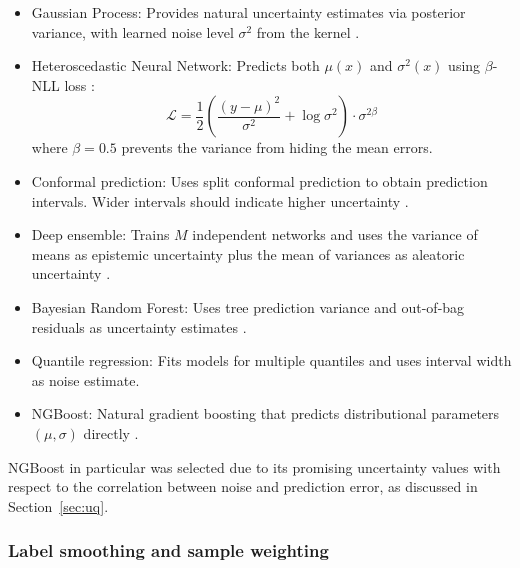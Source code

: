 \begin{itemize}
    \item Gaussian Process: Provides natural uncertainty estimates via posterior variance, with learned noise level $\sigma^2$ from the kernel \citep{gauche}.
    
    \item Heteroscedastic Neural Network: Predicts both $\mu(x)$ and $\sigma^2(x)$ using $\beta$-NLL loss \citep{Seitzer2022}:
    $$\mathcal{L} = \frac{1}{2}\left(\frac{(y - \mu)^2}{\sigma^2} + \log \sigma^2\right) \cdot \sigma^{2\beta}$$
    where $\beta = 0.5$ prevents the variance from hiding the mean errors.
    
    \item Conformal prediction: Uses split conformal prediction to obtain prediction intervals. Wider intervals should indicate higher uncertainty \citep{Shafer2008}.
    
    \item Deep ensemble: Trains $M$ independent networks and uses the variance of means as epistemic uncertainty plus the mean of variances as aleatoric uncertainty \citep{lakshminarayanan2017}.
    
    \item Bayesian Random Forest: Uses tree prediction variance and out-of-bag residuals as uncertainty estimates \citep{taddy2015}.
    
    \item Quantile regression: Fits models for multiple quantiles and uses interval width as noise estimate.
    
    \item NGBoost: Natural gradient boosting that predicts distributional parameters $(\mu, \sigma)$ directly \citep{Duan2020}.
\end{itemize}

NGBoost in particular was selected due to its promising uncertainty values with respect to the correlation between noise and prediction error, as discussed in Section~\ref{sec:uq}.  

\subsubsection{Label smoothing and sample weighting}


